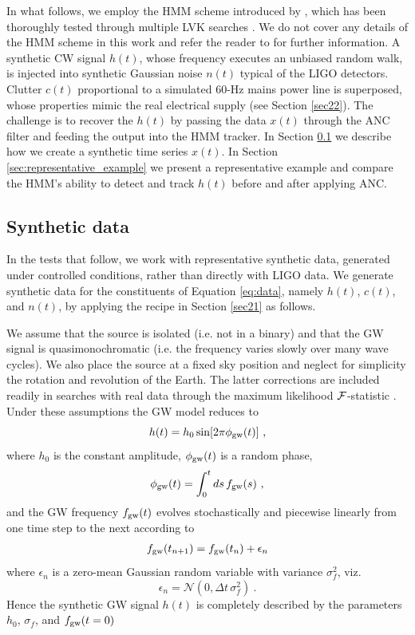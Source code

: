 \documentclass[pra,superscriptaddress,reprint,amsmath,amssymb,nofootinbib]{revtex4-2}
\begin{document}
In what follows, we employ the HMM scheme introduced by \citet{Suvorova2016PhRv}, which has been thoroughly tested through multiple LVK searches \cite{Piccinni2022,Riles2023,Wette2023}. We do not cover any details of the HMM scheme in this work and refer the reader to \citet{Suvorova2016PhRv} for further information. A synthetic CW signal $h(t)$, whose frequency executes an unbiased random walk, is injected into synthetic Gaussian noise $n(t)$ typical of the LIGO detectors. Clutter $c(t)$ proportional to a simulated 60-Hz mains power line is superposed, whose properties mimic the real electrical supply (see Section \ref{sec22}). The challenge is to recover the $h(t)$ by passing the data $x(t)$ through the ANC filter and feeding the output into the HMM tracker. In Section \ref{sec:creating_data} we describe how we create a synthetic time series $x(t)$. In Section \ref{sec:representative_example} we present a representative example and compare the HMM's ability to detect and track $h(t)$ before and after applying ANC. 

\subsection{Synthetic data} \label{sec:creating_data}
In the tests that follow, we work with representative synthetic data, generated under controlled conditions, rather than directly with LIGO data. We generate synthetic data for the constituents of Equation \eqref{eq:data}, namely $h(t)$, $c(t)$, and $n(t)$, by applying the recipe in Section \ref{sec21} as follows. \newline 

We assume that the source is isolated (i.e. not in a binary) and that the GW signal is quasimonochromatic (i.e. the frequency varies slowly over many wave cycles). We also place the source at a fixed sky position and neglect for simplicity the rotation and revolution of the Earth. The latter corrections are included readily in searches with real data through the maximum likelihood ${\cal F}$-statistic \citep{Jaranowski1998}. Under these assumptions the GW model reduces to 
\begin{equation}
	h(t) = h_0\sin[2\pi \phi_{\rm gw}(t)] \ , 
\end{equation}
where $h_0$ is the constant amplitude, $\phi_{\rm gw}(t)$ is a random phase,
\begin{equation}
	\phi_{\rm gw}(t) = \int_{0}^{t} ds \, f_{\rm gw}(s)  \ ,
\end{equation}
and the GW frequency $f_{\rm gw}(t)$ evolves stochastically and piecewise linearly from one time step to the next according to
\begin{eqnarray}
	f_{\rm gw}(t_{n+1}) = f_{\rm gw}(t_n) + \epsilon_n 
\end{eqnarray}
where $\epsilon_n$ is a zero-mean Gaussian random variable with variance $\sigma_f^2$, viz.
\begin{equation}
	\epsilon_n = \mathcal{N}(0, \Delta t  \, \sigma_f^2) \ . \label{eq:gwfreqnoise}
\end{equation}
Hence the synthetic GW signal $h(t)$ is completely described by the parameters $h_0$, $\sigma_f$, and $f_{\rm gw}(t=0)$ \newline 
\end{document}
